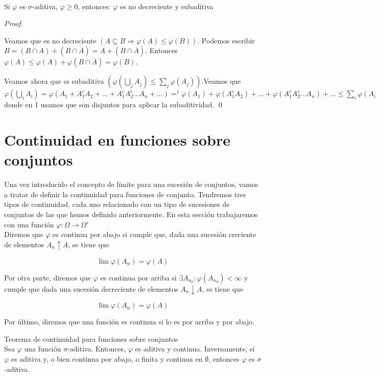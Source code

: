 \begin{theorem}
  \ 
  
Si $\varphi$ es $\sigma$-aditiva, $\varphi \geq 0$, entonces: $\varphi$ es no decreciente y subaditiva
\end{theorem}

\begin{proof}
  \
   
Veamos que es no decreciente $(A \subseteq B \Rightarrow \varphi (A) \leq \varphi (B))$. Podemos escribir $B = (B \cap A) + (B \cap \overline{A}) = A + (B \cap \overline{A})$. Entonces $\varphi (A) \leq \varphi (A) + \varphi (B \cap \overline{A}) = \varphi (B)$.

Veamos ahora que es subaditiva $(\varphi(\bigcup_{j} A_j) \le \sum_j \varphi(A_j))$.Veamos que 
$\varphi(\bigcup_{i} A_i) = \varphi(A_1 + A_1^c A_2 + ... + A_1^cA_2^c...A_n+ ...) =^1 \varphi(A_1) + \varphi(A_1^c A_2) + ... + \varphi(A_1^cA_2^c...A_n) + ... \leq  \sum_i \varphi(A_i)$ donde en 1 usamos que son disjuntos para aplicar la subaditividad.
\qed
\end{proof}

\section{Continuidad en funciones sobre conjuntos}

Una vez introducido el concepto de límite para una sucesión de conjuntos, vamos a tratar de definir la continuidad para funciones de conjunto. Tendremos tres tipos de continuidad, cada uno relacionado con un tipo de sucesiones de conjuntos de las que hemos definido anteriormente. En esta sección trabajaremos con una función $\varphi : \Omega \to \Omega'$\\

Diremos que $\varphi$ es continua por abajo si cumple que, dada una sucesión creciente de elementos $A_n \uparrow A$, se tiene que

$$ \lim \varphi (A_n) = \varphi (A) $$

Por otra parte, diremos que $\varphi$ es continua por arriba si $\exists A_{n_0} : \varphi (A_{n_0}) < \infty$ y cumple que dada una sucesión decreciente de elementos $A_n \downarrow A$, se tiene que

$$ \lim \varphi (A_n) = \varphi (A)$$

Por último, diremos que una función es continua si lo es por arriba y por abajo.

\begin{theorem}
Teorema de continuidad para funciones sobre conjuntos\\

Sea $\varphi$ una función $\sigma$-aditiva. Entonces, $\varphi$ es aditiva y continua. Inversamente, si $\varphi$ es aditiva y, o bien continua por abajo, o finita y continua en $\emptyset$, entonces $\varphi$ es $\sigma$-aditiva.
\end{theorem}

